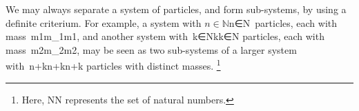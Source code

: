 We may always separate a system of particles, and form sub-systems, by using a definite criterium. For example, a system with $n\in\mathbb{N}$n∈N​ particles, each with mass m1m_1m1​​, and another system with k∈Nk\in{}k∈N​ particles, each with mass m2m_2m2​​, may be seen as two sub-systems of a larger system with n+kn+kn+k​ particles with distinct masses. \footnote{Here, NN​ represents the set of natural numbers.}